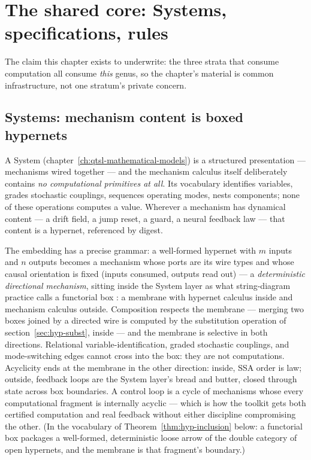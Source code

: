 \section{The shared core: Systems, specifications, rules}
\label{sec:hyp-core}

The claim this chapter exists to underwrite: the three strata that
consume computation all consume \emph{this} genus, so the chapter's
material is common infrastructure, not one stratum's private
concern.

\subsection*{Systems: mechanism content is boxed hypernets}

A System (chapter~\ref{ch:qtsl-mathematical-models}) is a structured
presentation --- mechanisms wired together --- and the mechanism
calculus itself deliberately contains \emph{no computational
primitives at all}. Its vocabulary identifies variables, grades
stochastic couplings, sequences operating modes, nests components; none
of these operations computes a value. Wherever a mechanism has
dynamical content --- a drift field, a jump reset, a guard, a neural
feedback law --- that content is a hypernet, referenced by digest.

The embedding has a precise grammar: a well-formed hypernet with $m$
inputs and $n$ outputs becomes a mechanism whose ports are its wire
types and whose causal orientation is fixed (inputs consumed, outputs
read out) --- a \emph{deterministic directional mechanism}, sitting
inside the System layer as what string-diagram practice calls a
functorial box \cite{mellies06csl}: a membrane with hypernet
calculus inside and mechanism calculus outside. Composition respects
the membrane --- merging two boxes joined by a directed wire is
computed by the substitution operation of
section~\ref{sec:hyp-subst}, inside --- and the membrane is
selective in both directions. Relational variable-identification,
graded stochastic couplings, and mode-switching edges cannot cross
into the box: they are not computations. Acyclicity ends at the
membrane in the other direction: inside, SSA order is law; outside,
feedback loops are the System layer's bread and butter, closed
through state across box boundaries. A control loop is a cycle of
mechanisms whose every computational fragment is internally acyclic
--- which is how the toolkit gets both certified computation and
real feedback without either discipline compromising the other. (In
the vocabulary of Theorem~\ref{thm:hyp-inclusion} below: a
functorial box packages a well-formed, deterministic loose arrow of
the double category of open hypernets, and the membrane is that
fragment's boundary.)


